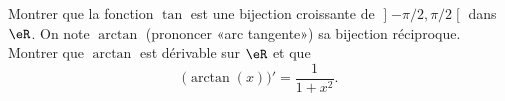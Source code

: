
\begin{exercice}\label{exomazhe-0016}
  
Montrer que la fonction $\tan$ est une bijection croissante de $\mathopen] -\pi/2 , \pi/2 \mathclose[$ dans $\eR$. On note $\arctan$ (prononcer «arc tangente») sa bijection réciproque. Montrer que $\arctan$ est dérivable sur $\eR$ et que
      \begin{equation}
	\big( \arctan(x) \big)'=\frac{1}{ 1+x^2 }.
      \end{equation}


\end{exercice}
